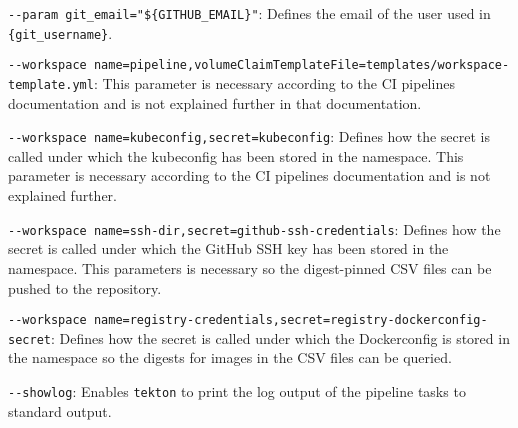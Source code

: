 \verb|--param git_email="${GITHUB_EMAIL}"|: Defines the email of the user used in \verb|{git_username}|.

\verb|--workspace name=pipeline,volumeClaimTemplateFile=templates/workspace-template.yml|: This parameter is necessary according to the CI pipelines documentation and is not explained further in that documentation.

\verb|--workspace name=kubeconfig,secret=kubeconfig|: Defines how the secret is called under which the kubeconfig has been stored in the namespace.
This parameter is necessary according to the CI pipelines documentation and is not explained further.

\verb|--workspace name=ssh-dir,secret=github-ssh-credentials|: Defines how the secret is called under which the GitHub SSH key has been stored in the namespace.
This parameters is necessary so the digest-pinned CSV files can be pushed to the repository.

\verb|--workspace name=registry-credentials,secret=registry-dockerconfig-secret|: Defines how the secret is called under which the Dockerconfig is stored in the namespace so the digests for images in the CSV files can be queried.

\verb|--showlog|: Enables \verb|tekton| to print the log output of the pipeline tasks to standard output.

